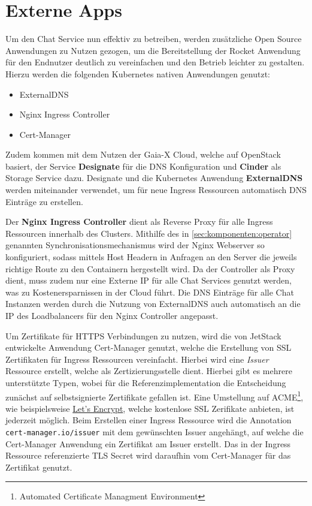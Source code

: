\section{Externe Apps}
\label{sec:komponenten:externe-apps}

Um den Chat Service nun effektiv zu betreiben, werden zusätzliche Open Source Anwendungen zu Nutzen gezogen,
um die Bereitstellung der Rocket Anwendung für den Endnutzer deutlich zu vereinfachen und den Betrieb leichter zu gestalten.
Hierzu werden die folgenden Kubernetes nativen Anwendungen genutzt:
\begin{itemize}
  \item ExternalDNS
  \item Nginx Ingress Controller
  \item Cert-Manager
\end{itemize}

Zudem kommen mit dem Nutzen der Gaia-X Cloud, welche auf OpenStack basiert, der Service \textbf{Designate}
für die DNS Konfiguration und \textbf{Cinder} als Storage Service dazu. 
Designate und die Kubernetes Anwendung \textbf{ExternalDNS} werden miteinander
verwendet, um für neue Ingress Ressourcen automatisch DNS Einträge zu erstellen. 

Der \textbf{Nginx Ingress Controller} dient als Reverse Proxy für alle Ingress Ressourcen innerhalb des Clusters.
Mithilfe des in \ref{sec:komponenten:operator} genannten Synchronisationsmechanismus wird der Nginx Webserver so 
konfiguriert, sodass mittels Host Headern in Anfragen an den Server die jeweils richtige Route zu den Containern hergestellt wird. 
Da der Controller als Proxy dient, muss zudem nur eine Externe IP für alle Chat Services genutzt werden, was
zu Kostenersparnissen in der Cloud führt. Die DNS Einträge für alle Chat Instanzen werden durch die Nutzung 
von ExternalDNS auch automatisch an die IP des Loadbalancers für den Nginx Controller angepasst.

Um Zertifikate für HTTPS Verbindungen zu nutzen, wird die von JetStack entwickelte Anwendung Cert-Manager genutzt,
welche die Erstellung von SSL Zertifikaten für Ingress Ressourcen vereinfacht. Hierbei wird eine \emph{Issuer} Ressource
erstellt, welche als Zertizierungsstelle dient.\cite{CertManager2021} Hierbei gibt es mehrere unterstützte Typen, 
wobei für die Referenzimplementation die Entscheidung zunächst auf selbstsignierte Zertifikate gefallen ist.
Eine Umstellung auf ACME\footnote{Automated Certificate Managment Environment},
wie beispielsweise \href{https://letsencrypt.org/de/}{Let's Encrypt}, welche kostenlose SSL Zerifikate anbieten,
ist jederzeit möglich. 
Beim Erstellen einer Ingress Ressource wird die Annotation \texttt{cert-manager.io/issuer} mit dem gewünschten Issuer angehängt,
auf welche die Cert-Manager Anwendung ein Zertifikat am Issuer erstellt. 
Das in der Ingress Ressource referenzierte TLS Secret wird daraufhin vom Cert-Manager für das Zertifikat genutzt.

